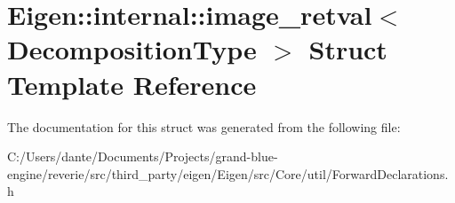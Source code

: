 \hypertarget{struct_eigen_1_1internal_1_1image__retval}{}\section{Eigen\+::internal\+::image\+\_\+retval$<$ Decomposition\+Type $>$ Struct Template Reference}
\label{struct_eigen_1_1internal_1_1image__retval}


The documentation for this struct was generated from the following file\+:\begin{DoxyCompactItemize}
\item 
C\+:/\+Users/dante/\+Documents/\+Projects/grand-\/blue-\/engine/reverie/src/third\+\_\+party/eigen/\+Eigen/src/\+Core/util/Forward\+Declarations.\+h\end{DoxyCompactItemize}
